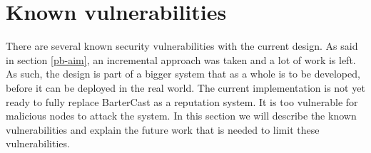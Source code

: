 \chapter{Known vulnerabilities}
\label{problems}
There are several known security vulnerabilities with the current design.
As said in section \ref{pb-aim}, an incremental approach was taken and a lot of work is left.
As such, the design is part of a bigger system that as a whole is to be developed,
before it can be deployed in the real world.
The current implementation is not yet ready to fully replace BarterCast as a reputation system.
It is too vulnerable for malicious nodes to attack the system.
In this section we will describe the known vulnerabilities
and explain the future work that is needed to limit these vulnerabilities.









